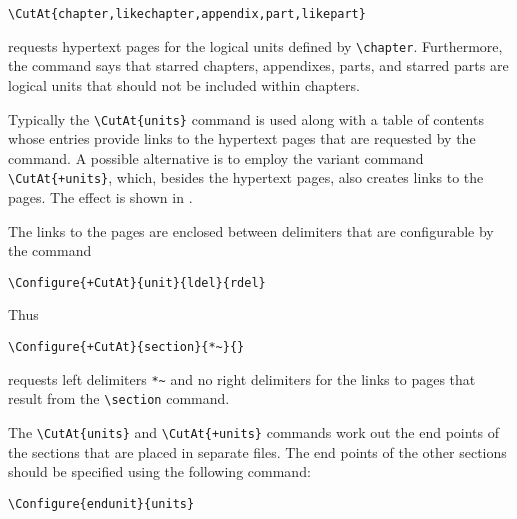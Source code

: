 \begin{lstlisting}
\CutAt{chapter,likechapter,appendix,part,likepart} 
\end{lstlisting}

requests hypertext pages for the logical units defined by \verb|\chapter|. Furthermore, 
the command says that starred chapters, appendixes, parts, and starred parts are 
logical units that should not be included within chapters. 

Typically the \lstinline|\CutAt{units}| command is used along with a
table of contents whose entries provide links to the hypertext pages
that are requested by the command. A possible alternative is to employ
the variant command \lstinline|\CutAt{+units}|, which, besides the
hypertext pages, also creates links to the pages. The effect is shown in
. 

The links to the pages are enclosed between delimiters that are
configurable by the command 
 
 
\begin{lstlisting}
\Configure{+CutAt}{unit}{ldel}{rdel} 
\end{lstlisting}

Thus 

\begin{lstlisting}
\Configure{+CutAt}{section}{*~}{} 
\end{lstlisting}

requests left delimiters \verb|*~| and no right delimiters for the links to pages that result 
from the \verb|\section| command. 


The \lstinline|\CutAt{units}| and \lstinline|\CutAt{+units}| commands
work out the end points of the sections that are placed in separate
files. The end points of the other sections should be specified using
the following command: 

\begin{lstlisting}
\Configure{endunit}{units} 
\end{lstlisting}

